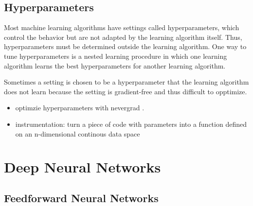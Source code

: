 \documentclass{scrartcl}
\begin{document}
\subsection{Hyperparameters}

Most machine learning algorithms have settings called hyperparameters, which control the behavior but are not adapted by the learning algorithm itself. Thus, hyperparameters must be determined outside the learning algorithm. One way to tune hyperparameters is a nested learning procedure in which one learning algorithm learns the best hyperparameters for another learning algorithm. 

Sometimes a setting is chosen to be a hyperparameter that the learning algorithm does not learn because the setting is gradient-free and thus difficult to opptimize.  


\begin{itemize}
\item optimzie hyperparameters with nevergrad \cite{nevergrad}.
\item instrumentation: turn a piece of code with parameters into a function defined on an n-dimensional continous data space
\end{itemize}





\newpage


\section{Deep Neural Networks}


\subsection{Feedforward Neural Networks}
\end{document}
